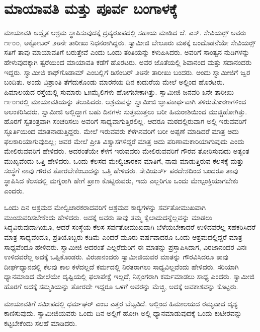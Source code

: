 
\chapter{ಮಾಯಾವತಿ ಮತ್ತು ಪೂರ್ವ ಬಂಗಾಳಕ್ಕೆ }

 ಮಾಯಾವತಿ ಅದ್ವೈತ ಆಶ್ರಮ ಸ್ಥಾಪಿಸುವುದಕ್ಕೆ ದ್ರವ್ಯರೂಪದಲ್ಲಿ ಸಹಾಯ ಮಾಡಿದ ಜೆ. ಎಸ್. ಸೇವಿಯರ್ಸ್‍‍ ಅವರು ೧೯೦೦, ಅಕ್ಟೋಬರ್ ೨೮ನೇ ತಾರೀಖು ನಿಧನರಾಗಿದ್ದರು. ಸ್ವಾಮೀಜಿ ಬೇಲೂರು ಮಠಕ್ಕೆ ಬಂದೊಡನೆಯೇ ಸೇವಿಯರ್ಸ್‍‍ ಸತಿಗೆ ತಾವು ಮಾಯಾವತಿಗೆ ಬರುತ್ತೇವೆ ಎಂದು ಒಂದು ತಂತಿಯನ್ನು ಕಳುಹಿಸಿದರು. ಅವರಿಗೆ ಸಾಂತ್ವನ ನುಡಿಗಳನ್ನು ಹೇಳುವುದಕ್ಕಾಗಿ ತ್ವರೆಯಿಂದ ಮಾಯಾವತಿ ಕಡೆಗೆ ಹೊರಟರು. ಅವರ ಜೊತೆಯಲ್ಲಿ ಶಿವಾನಂದ ಮತ್ತು ಸದಾನಂದರು ಇದ್ದರು. ಸ್ವಾಮೀಜಿ ಕಾಥ್‍ಗೊಡಾಮ್ ಎಂಬಲ್ಲಿಗೆ ಡಿಸೆಂಬರ್ ೨೮ನೇ ತಾರೀಖು ಬಂದರು. ಅಂದು ಸ್ವಾಮೀಜಿಗೆ ಜ್ವರ ಬಂದಿತು. ಅಂದು ವಿಶ್ರಾಂತಿ ತೆಗೆದುಕೊಂಡು ಮಾರನೆಯ ದಿನ ಕುದುರೆಯ ಮೇಲೆ ಅಲ್ಲಿಂದ ಹೊರಟರು. ಹಿಮಾಲಯದ ರಸ್ತೆಯಲ್ಲಿ ಸುಮಾರು ೬೫ಮೈಲಿಗಳು ಹೋಗಬೇಕಾಗಿತ್ತು. ಸ್ವಾಮೀಜಿ ಜನವರಿ ೩ನೇ ತಾರೀಖು ೧೯೦೧ರಲ್ಲಿ ಮಾಯಾವತಿಯನ್ನು ತಲುಪಿದರು. ಆಶ್ರಮವನ್ನು ಸ್ವಾಮೀಜಿ ಜ್ಞಾಪಕಾರ್ಥವಾಗಿ ತಳಿರುತೋರಣಗಳಿಂದ ಅಲಂಕರಿಸಿದರು. ಸ್ವಾಮೀಜಿ ಅಲ್ಲಿದ್ದಾಗ ಬಹು ದಿನಗಳು ಸುತ್ತಮುತ್ತಲು ಬರೀ ಹಿಮರಾಶಿಯಿಂದ ಮುಚ್ಚಿಹೋಗಿತ್ತು. ಹೊರಗೆ ಸ್ವತಂತ್ರವಾಗಿ ಸಂಚರಿಸಲು ಅವರಿಗೆ ಸಾಧ್ಯವಾಗುತ್ತಿರಲಿಲ್ಲ. ಆದರೂ ಮಠದಲ್ಲಿರುವಾಗ ಅಲ್ಲಿ ಇರುವವರಿಗೆ ಸ್ಫೂರ್ತಿಯಿಂದ ಮಾತನಾಡುತ್ತಿದ್ದರು. ಮೇಲೆ ಇರುವವರು ಕೆಳಗಿನವರಿಗೆ ಬರೀ ಅಪ್ಪಣೆ ಮಾಡಿದರೆ ಮಾತ್ರ ಅದು ಫಲಕಾರಿಯಾಗುವುದಿಲ್ಲ; ಅವರ ಮೇಲೆ ಪ್ರೀತಿ ವಿಶ್ವಾಸಗಳಿದ್ದರೆ ಮಾತ್ರ ಅದು ಪರಿಣಾಮಕಾರಿಯಾಗುವುದು ಎಂದು ಮೇಲಿರುವವರಿಗೆ ಹೇಳಿದರು. ಅದರಂತೆಯೇ ಕೆಳಗೆ ಇರುವವರು ಮೇಲಿರುವವರಿಗೆ ಗೌರವ ತೋರಿಸುವುದು ಅತ್ಯಂತ ಮುಖ್ಯವೆಂದು ಒತ್ತಿ ಹೇಳಿದರು. ಒಂದು ಕೆಲಸದ ಮೇಲ್ವಿಚಾರಕನ ಮಾತಿಗೆ, ನಾವು ಮಾಡುತ್ತಿರುವ ಕೆಲಸಕ್ಕೆ ಮತ್ತು ಸಂಸ್ಥೆಗೆ ನಾವು ಗೌರವ ತೋರಬೇಕೆಂಬುದನ್ನು ಒತ್ತಿ ಹೇಳಿದರು. ಸೇವಿಯರ್ಸ್ ಪರದೇಶದಿಂದ ಬಂದರೂ ತಾವು ಸ್ಥಾಪಿಸಿದ ಕೆಲಸದಲ್ಲಿ ಮಗ್ನರಾಗಿ ಹೇಗೆ ಪ್ರಾಣ ಕೊಟ್ಟಿರುವರು, ಇದು ಎಲ್ಲರಿಗೂ ಒಂದು ಮೇಲ್ಪಂಕ್ತಿಯಾಗಬೇಕು ಎಂದರು. 

 ಒಂದು ದಿನ ಆಶ್ರಮದ ಮೇಲ್ವಿಚಾರಕರಾದವರಿಗೆ ಆಶ್ರಮದ ಕಾರ‍್ಯ‍ಗಳನ್ನು ಸರ್ವತೋಮುಖವಾಗಿ ಮುಂದುವರಿಸಬೇಕೆಂದು ಹೇಳಿದರು. ಅದಕ್ಕೆ ಅವರು ತಾವು ತಮ್ಮ ಕೈಲಾದುದನ್ನೆಲ್ಲವನ್ನು ಮಾಡಲು ಸಿದ್ಧವಿರುವುದಾಗಿಯೂ, ಆದರೆ ಸಂಸ್ಥೆಯ ಕೆಲಸ ಸರ್ವತೋಮುಖವಾಗಿ ಬೆಳೆಯಬೇಕಾದರೆ ಉಳಿದವರೆಲ್ಲ ಸಹಕರಿಸಿದರೆ ಮಾತ್ರ ಸಾಧ್ಯವೆಂದೂ, ಪ್ರತಿಯೊಬ್ಬರು ಕಡಿಮೆ ಎಂದರೆ ಮೂರು ವರ್ಷವಾದರೂ ಒಂದು ಆಶ್ರಮದಲ್ಲಿದ್ದರೆ ಮಾತ್ರ ಸಾಧ್ಯವೆಂದೂ ಹೇಳಿದರು. ಸ್ವಾಮೀಜಿ ಅದರಂತೆ ಎಲ್ಲರೆದುರಿಗೆ ಈ ಮಾತನ್ನು ಪ್ರಸ್ತಾಪಿಸಿದಾಗ, ವಿರಜಾನಂದರ ವಿನಃ ಉಳಿದವರೆಲ್ಲ ಅದಕ್ಕೆ ಒಪ್ಪಿಕೊಂಡರು. ವಿರಜಾನಂದರು ಸ್ವಾಮೀಜಿಯವರ ಮಾತನ್ನು ಗೌರವಿಸಿದರೂ ತಾವು ದೀರ್ಘಧ್ಯಾನದಲ್ಲಿ ಕೆಲವು ಕಾಲ ಕಳೆದಲ್ಲದೆ ಕರ್ಮದಲ್ಲಿ ನಿರತರಾಗಲು ಸಾಧ್ಯವಿಲ್ಲವೆಂದು ಹೇಳಿದರು. ಸರಿಯಾಗಿ ಧ್ಯಾನಮಾಡಿದ ಮೇಲೆಯೇ ದೃಷ್ಟಿಯಲ್ಲಿ ಫಲಾಪೇಕ್ಷೆ ಇಲ್ಲದೆ, ನಿಸ್ಸಂಗರಾಗಿ ಕರ್ಮಮಾಡಲು ಸಾಧ್ಯ ಎಂದರು. ಸ್ವಾಮೀಜಿ ಹೊರಗೆ ಅದಕ್ಕೆ ಸಮ್ಮತಿಯನ್ನು ತೋರದೇ ಇದ್ದರೂ ಒಳಗೆ ಅವರನ್ನು ಮೆಚ್ಚಿ, ಅದಕ್ಕೆ ಅವಕಾಶವನ್ನು ಕೊಟ್ಟರು. 

 ಮಾಯಾವತಿಗೆ ಸಮೀಪದಲ್ಲಿ ಧರ್ಮಘರ್ ಎಂಬ ಎತ್ತರ ಬೆಟ್ಟವಿದೆ. ಅಲ್ಲಿಂದ ಹಿಮಾಲಯದ ರಮ್ಯವಾದ ದೃಶ್ಯ ಕಾಣಿಸುವುದು. ಸ್ವಾಮೀಜಿಯವರು ಒಂದು ದಿನ ಅಲ್ಲಿಗೆ ಹೋಗಿ ಅಲ್ಲಿ ಧ್ಯಾನಮಾಡುವುದಕ್ಕೆ ಒಂದು ಕುಟೀರವನ್ನು ಕಟ್ಟಬೇಕೆಂದು ಸಲಹೆ ಮಾಡಿದರು. 


